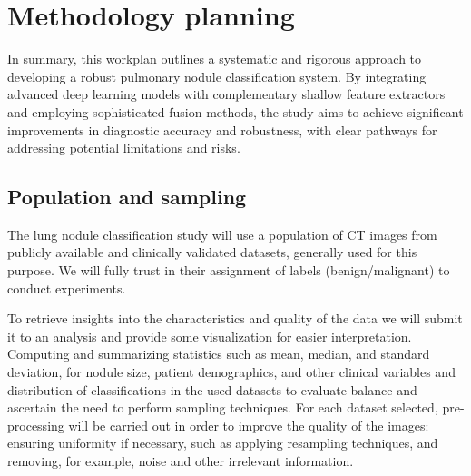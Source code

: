 \chapter{Methodology planning }\label{chap:chap4}
In summary, this workplan outlines a systematic and rigorous approach to developing a robust pulmonary nodule classification system. By integrating advanced deep learning models with complementary shallow feature extractors and employing sophisticated fusion methods, the study aims to achieve significant improvements in diagnostic accuracy and robustness, with clear pathways for addressing potential limitations and risks.

    
    
    
    
    
\section{Population and sampling}
    The lung nodule classification study will use a population of CT images from publicly available and clinically validated datasets, generally used for this purpose. We will fully trust in their assignment of labels (benign/malignant) to conduct experiments. 
    
    To retrieve insights into the characteristics and quality of the data we will submit it to an analysis and provide some visualization for easier interpretation. Computing and summarizing statistics such as mean, median, and standard deviation, for nodule size, patient demographics, and other clinical variables and distribution of classifications in the used datasets to evaluate balance and ascertain the need to perform sampling techniques. For each dataset selected, pre-processing will be carried out in order to improve the quality of the images: ensuring uniformity if necessary, such as applying resampling techniques, and removing, for example, noise and other irrelevant information.
    
